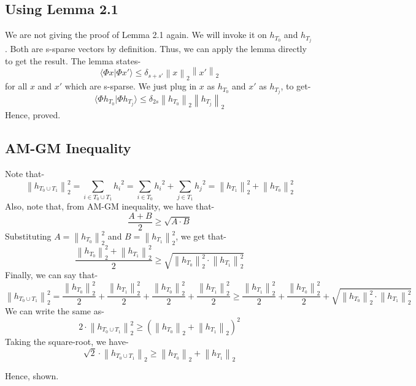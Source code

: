 \documentclass[a4paper,11pt]{article}
\numberwithin{definition}{section}
\numberwithin{mytheorem}{subsection}
\newcommand\norm[1]{\left\lVert#1\right\rVert}
\begin{document}
\subsection{Using Lemma 2.1}
We are not giving the proof of Lemma 2.1 again. We will invoke it on $h_{T_0}$ and $h_{T_j}$. Both are s-sparse vectors by definition. Thus, we can apply the lemma directly to get the result. The lemma states-
$$\langle \Phi x| \Phi x' \rangle \leq \delta_{s + s'} \norm{x}_2 \norm{x'}_2$$
for all $x$ and $x'$ which are s-sparse.
We just plug in $x$ as $h_{T_0}$ and $x'$ as $h_{T_j}$, to get-
$$\langle \Phi h_{T_0}| \Phi h_{T_j}\rangle \leq \delta_{2s}\norm{h_{T_0}}_2 \norm{h_{T_j}}_2$$
Hence, proved.

\subsection{AM-GM Inequality}
Note that-
$$\norm{h_{T_0 \cup T_1}}^2_2 = \sum_{i \in T_0\cup T_1} {h_i}^2 = \sum_{i \in T_0} {h_i}^2 + \sum_{j \in T_1} {h_j}^2 = \norm{h_{T_1}}^2_2 + \norm{h_{T_0}}^2_2$$
Also, note that, from AM-GM inequality, we have that-
$$\frac{A+B}{2} \geq \sqrt{A\cdot B}$$
Substituting $A = \norm{h_{T_0}}^2_2$ and $B = \norm{h_{T_1}}^2_2$, we get that-
$$\frac{\norm{h_{T_0}}^2_2+\norm{h_{T_1}}^2_2}{2} \geq \sqrt{\norm{h_{T_0}}^2_2\cdot \norm{h_{T_1}}^2_2}$$
Finally, we can say that-
$$\norm{h_{T_0 \cup T_1}}^2_2 = \frac{\norm{h_{T_0}}^2_2}{2}  + \frac{\norm{h_{T_1}}^2_2}{2}  + \frac{\norm{h_{T_0}}^2_2}{2} + \frac{\norm{h_{T_1}}^2_2}{2} \geq \frac{\norm{h_{T_1}}^2_2}{2} + \frac{\norm{h_{T_0}}^2_2}{2} + \sqrt{\norm{h_{T_0}}^2_2\cdot \norm{h_{T_1}}^2_2}$$
We can write the same as-
$$2 \cdot \norm{h_{T_0 \cup T_1}}^2_2 \geq (\norm{h_{T_0}}_2 + \norm{h_{T_1}}_2)^{2}$$
Taking the square-root, we have-
$$\sqrt{2} \cdot \norm{h_{T_0 \cup T_1}}_2 \geq \norm{h_{T_0}}_2 + \norm{h_{T_1}}_2$$

Hence, shown.

\subsection{}
\end{document}
